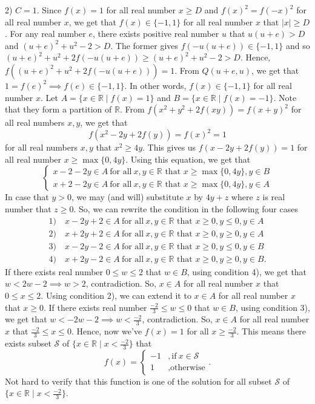 \begin{solution}
2) $C=1$.
Since $f(x)=1$ for all real number $x\geq D$ and $f(x)^2=f(-x)^2$ for all real number $x$, we get that $f(x)\in \{ -1,1\}$ for all real number $x$ that $|x|\geq D$.
For any real number $e$, there exists positive real number $u$ that $u(u+e)>D$ and $(u+e)^2+u^2-2>D$.
The former gives $f(-u(u+e))\in \{ -1,1\} $ and so $(u+e)^2+u^2+2f(-u(u+e)) \geq (u+e)^2+u^2-2>D$.
Hence, $f((u+e)^2+u^2+2f(-u(u+e))) =1$.
From $Q(u+e,u)$, we get that $1=f(e)^2\implies f(e)\in \{ -1,1\}$.
In other words, $f(x)\in \{ -1,1\}$ for all real number $x$.
Let $A=\{ x\in \mathbb{R}\mid f(x)=1\}$ and $B=\{ x\in \mathbb{R}\mid f(x)=-1\}$. Note that they form a partition of $\mathbb{R}$.
From $f(x^2+y^2+2f(xy)) =f(x+y)^2$ for all real numbers $x,y$, we get that 
$$f(x^2-2y+2f(y))=f(x)^2=1$$ for all real numbers $x,y$ that $x^2\geq 4y$.
This gives us $f(x-2y+2f(y))=1$ for all real number $x\geq \max \{ 0,4y\}$.
Using this equation, we get that
$$\begin{cases}
 x-2-2y\in A  \ \text{for all} \ x,y\in \mathbb{R}\text{ that }x\geq \max \{ 0,4y\} ,y\in B\\
 x+2-2y \in A  \ \text{for all} \ x,y\in \mathbb{R}\text{ that }x\geq \max \{ 0,4y\} ,y\in A
\end{cases} $$
In case that $y>0$, we may (and will) substitute $x$ by $4y+z$ where $z$ is real number that $z\geq 0$.
So, we can rewrite the condition in the following four cases
\begin{align*}
1) & \ x-2y+2\in A \ \text{for all} \ x,y\in \mathbb{R}\text{ that }x\geq 0,y\leq 0,y\in A \\
2) & \ x+2y+2\in A \ \text{for all} \ x,y\in \mathbb{R}\text{ that }x\geq 0,y\geq 0,y\in A \\
3) & \ x-2y-2\in A \ \text{for all} \ x,y\in \mathbb{R}\text{ that }x\geq 0,y\leq 0,y\in B \\
4) & \ x+2y-2\in A \ \text{for all} \ x,y\in \mathbb{R}\text{ that }x\geq 0,y\geq 0,y\in B.
\end{align*}
If there exists real number $0\leq w\leq 2$ that $w\in B$, using condition 4), we get that $w<2w-2 \implies w>2$, contradiction.
So, $x\in A$ for all real number $x$ that $0\leq x\leq 2$.
Using condition 2), we can extend it to $x\in A$ for all real number $x$ that $x\geq 0$.
If there exists real number $\frac{-2}{3} \leq w\leq 0$ that $w\in B$, using condition 3), we get that $w<-2w-2\implies w<\frac{-2}{3}$, contradiction.
So, $x\in A$ for all real number $x$ that $\frac{-2}{3}\leq x\leq 0$.
Hence, now we’ve $f(x)=1$ for all $x\geq \frac{-2}{3}$.
This means there exists subset $\mathcal{S}$ of $\{ x\in \mathbb{R}\mid x<\frac{-2}{3} \}$ that 
$$f(x)=\begin{cases} 
-1& , \text{if} \ x\in \mathcal{S}\\
1& , \text{otherwise}
\end{cases}.$$
Not hard to verify that this function is one of the solution for all subset $\mathcal{S}$ of $\{ x\in \mathbb{R}\mid x<\frac{-2}{3} \}$.


\end{solution}
